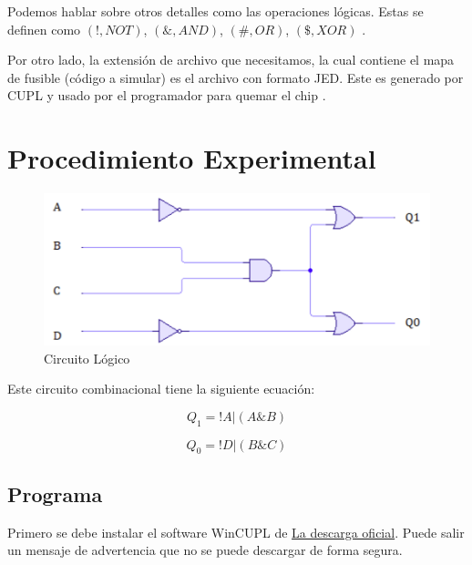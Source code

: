 \documentclass{article}
\begin{document}
    Podemos hablar sobre otros detalles como las operaciones lógicas. Estas
    se definen como $(!, NOT)$, $(\&, AND)$, $(\#, OR)$, $(\$, XOR)$
    \cite{warneke-1998}.

    \bigbreak

    Por otro lado, la extensión de archivo que necesitamos, la cual contiene
    el mapa de fusible (código a simular) es el archivo con formato JED. Este
    es generado por CUPL y usado por el programador para quemar el chip
    \cite{warneke-1998}.

    \section{Procedimiento Experimental}\label{sec:procedimiento-experimental}

    \begin{figure}[H]
        \centering
        \includegraphics[width=0.5\paperwidth]{images/logic-circuit}
        \caption{Circuito Lógico}
    \end{figure}

    Este circuito combinacional tiene la siguiente ecuación:

    $$Q_1 = !A | (A \& B)$$

    $$Q_0 = !D | (B \& C)$$

    \subsection{Programa}

    Primero se debe instalar el software WinCUPL de
    \href{https://www.microchip.com/en-us/products/fpgas-and-plds/spld-cplds/pld-design-resources}{La descarga oficial}.
    Puede salir un mensaje de advertencia que no se puede descargar de forma
    segura.
\end{document}
